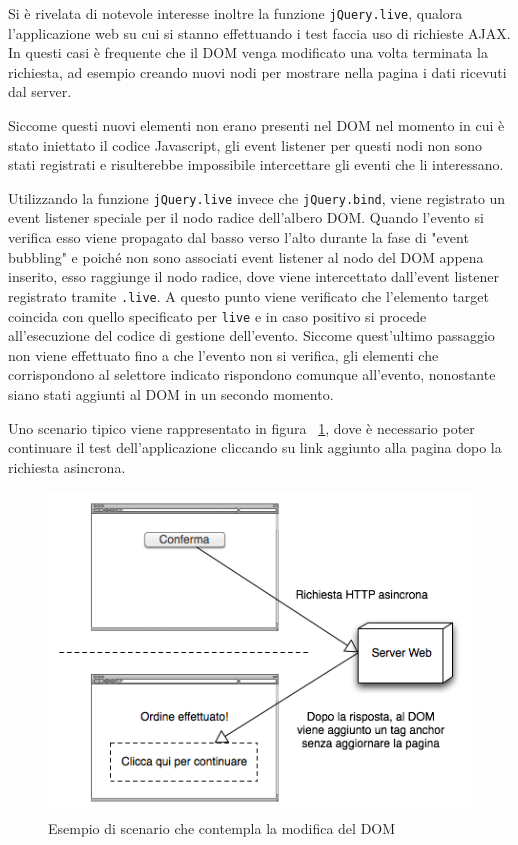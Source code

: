 Si è rivelata di notevole interesse inoltre la funzione \verb|jQuery.live|, qualora l'applicazione web su cui si stanno effettuando i test faccia uso di richieste AJAX. In questi casi è frequente che il DOM venga modificato una volta terminata la richiesta, ad esempio creando nuovi nodi per mostrare nella pagina i dati ricevuti dal server. 

Siccome questi nuovi elementi non erano presenti nel DOM nel momento in cui è stato iniettato il codice Javascript, gli event listener per questi nodi non sono stati registrati e risulterebbe impossibile intercettare gli eventi che li interessano. 

Utilizzando la funzione \verb|jQuery.live| invece che \verb|jQuery.bind|, viene registrato un event listener speciale per il nodo radice dell'albero DOM. Quando l'evento si verifica esso viene propagato dal basso verso l'alto durante la fase di "event bubbling" e poiché non sono associati event listener al nodo del DOM appena inserito, esso raggiunge il nodo radice, dove viene intercettato dall'event listener registrato tramite \verb|.live|. A questo punto viene verificato che l'elemento target coincida con quello specificato per \verb|live| e in caso positivo si procede all'esecuzione del codice di gestione dell'evento. Siccome quest'ultimo passaggio non viene effettuato fino a che l'evento non si verifica, gli elementi che corrispondono al selettore indicato rispondono comunque all'evento, nonostante siano stati aggiunti al DOM in un secondo momento.

Uno scenario tipico viene rappresentato in figura ~\ref{fig:liveEventCase}, dove è necessario poter continuare il test dell'applicazione cliccando su link aggiunto alla pagina dopo la richiesta asincrona.

\begin{figure}[htbp]
\begin{center}
\includegraphics[width=\textwidth]{images/live_event_case.png}
\caption{Esempio di scenario che contempla la modifica del DOM}
\label{fig:liveEventCase}
\end{center}
\end{figure}


